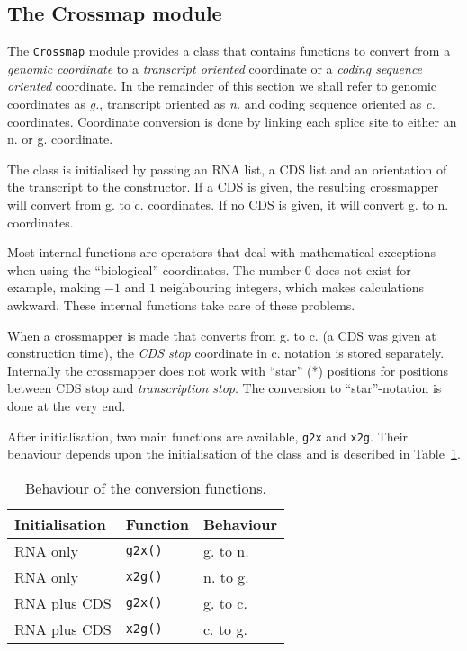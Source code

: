 \documentclass{article}
\begin{document}
\subsection{The Crossmap module} \label{subsec:crossmap}
The \texttt{Crossmap} module provides a class that contains functions to
convert from a \emph{genomic coordinate} to a \emph{transcript oriented}
coordinate or a \emph{coding sequence oriented} coordinate. In the remainder
of this section we shall refer to genomic coordinates as \emph{g.}, transcript oriented as \emph{n.} and coding sequence oriented as \emph{c.} coordinates.
Coordinate conversion is done by linking each splice site to either an n. or
g. coordinate.

The class is initialised by passing an RNA list, a CDS list and an orientation
of the transcript to the constructor. If a CDS is given, the resulting
crossmapper will convert from g. to c. coordinates. If no CDS is given, it will
convert g. to n. coordinates.

Most internal functions are operators that deal with mathematical exceptions
when using the ``biological'' coordinates. The number $0$ does not exist for
example, making $-1$ and $1$ neighbouring integers, which makes calculations
awkward. These internal functions take care of these problems.

When a crossmapper is made that converts from g. to c. (a CDS was given at
construction time), the \emph{CDS stop} coordinate in c. notation is stored
separately. Internally the crossmapper does not work with ``star'' (*)
positions for positions between CDS stop and \emph{transcription stop}. The
conversion to ``star''-notation is done at the very end.

After initialisation, two main functions are available, \texttt{g2x} and
\texttt{x2g}. Their behaviour depends upon the initialisation of the class and
is described in Table~\ref{tab:behaviour}.

\begin{table}[H]
\begin{center}
\begin{tabular}{l|l|l}
Initialisation & Function       & Behaviour \\
\hline
RNA only       & \texttt{g2x()} & g. to n. \\
RNA only       & \texttt{x2g()} & n. to g. \\
RNA plus CDS   & \texttt{g2x()} & g. to c. \\
RNA plus CDS   & \texttt{x2g()} & c. to g.
\end{tabular}
\caption{Behaviour of the conversion functions.} \label{tab:behaviour}
\end{center}
\end{table}
\end{document}
